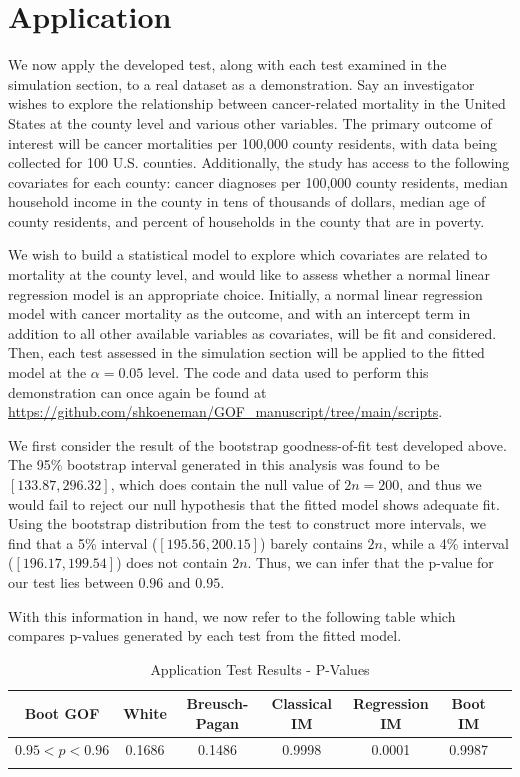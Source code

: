 \documentclass[sn-mathphys-ay]{sn-jnl}
\begin{document}
\section{Application}

We now apply the developed test, along with each test examined in the simulation section, to a real dataset as a demonstration. Say an investigator wishes to explore the relationship between cancer-related mortality in
the United States at the county level and various other variables. The primary outcome of interest will be cancer mortalities per 100,000 county residents, with data being collected for 100 U.S. counties. Additionally, the study has access to the
following covariates for each county: cancer diagnoses per 100,000 county residents, median household income in the county in tens of thousands of dollars, median age of county residents, and 
percent of households in the county that are in poverty.

We wish to build a statistical model to explore which covariates are related to mortality at the county level, and would like to assess whether a normal linear regression model is an 
appropriate choice. Initially, a normal linear regression model with cancer mortality as the outcome, and with an intercept term in addition to all
other available variables as covariates, will be fit and considered. Then, each test assessed in the simulation section will be applied to the fitted model at the
$\alpha = 0.05$ level. The code and data used to perform this demonstration can once again be found at \url{https://github.com/shkoeneman/GOF_manuscript/tree/main/scripts}.

We first consider the result of the bootstrap goodness-of-fit test developed above. The 95\% bootstrap interval generated in this analysis was found to be 
$\left[ 133.87, 296.32 \right]$, which does contain the null value of $2n = 200$, and thus we would fail to reject our null hypothesis that the fitted model shows
adequate fit. Using the bootstrap distribution from the test to construct more intervals, we find that a 5\% interval
($\left[ 195.56, 200.15 \right]$) barely contains $2n$, while a 4\% interval ($\left[ 196.17, 199.54 \right]$) does not contain $2n$. Thus,
we can infer that the p-value for our test lies between $0.96$ and $0.95$.

With this information in hand, we now refer to the following table which compares p-values generated by each test from the fitted model.

\begin{table}[h]
	\caption{Application Test Results - P-Values}\label{apptab}%
	\begin{tabular}{ c|c|c|c|c|c|c}
	\toprule
	Boot GOF & White & Breusch-Pagan & Classical IM & Regression IM & Boot IM \\
	\midrule
	$0.95<p<0.96$ & 0.1686 & 0.1486 & 0.9998 & 0.0001 & 0.9987 \\
	\botrule
	\end{tabular}
	
	\end{table}
\end{document}
